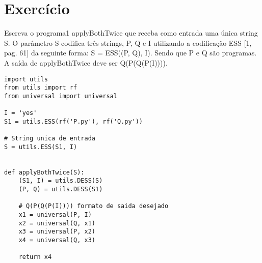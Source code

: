 \documentclass[12pt]{scrartcl}
\begin{document}
\section{Exercício}
Escreva o programa1 applyBothTwice que receba como entrada uma única string S.
O parâmetro S codifica três strings, P, Q e I utilizando a codificação ESS [1, pag. 61]
da seguinte forma: S = ESS((P, Q), I). Sendo que P e Q são programas. A saída de
applyBothTwice deve ser Q(P(Q(P(I)))).

\begin{verbatim}
import utils
from utils import rf
from universal import universal

I = 'yes'
S1 = utils.ESS(rf('P.py'), rf('Q.py'))

# String unica de entrada
S = utils.ESS(S1, I)


def applyBothTwice(S):
    (S1, I) = utils.DESS(S)
    (P, Q) = utils.DESS(S1)

    # Q(P(Q(P(I)))) formato de saida desejado
    x1 = universal(P, I)
    x2 = universal(Q, x1)
    x3 = universal(P, x2)
    x4 = universal(Q, x3)

    return x4
\end{verbatim}
\end{document}
